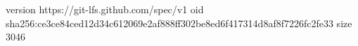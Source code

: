 version https://git-lfs.github.com/spec/v1
oid sha256:ce3ce84ced12d34c612069e2af888ff302be8ed6f417314d8af8f7226fc2fe33
size 3046
